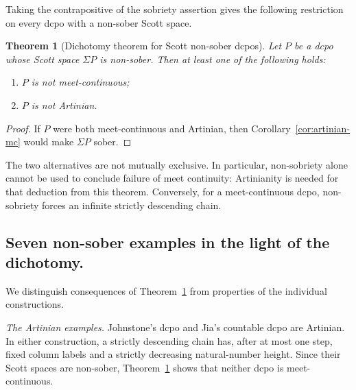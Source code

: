 \documentclass[11pt,reqno]{amsart}
\newtheorem{theorem}{Theorem}[section]
\theoremstyle{definition}
\numberwithin{equation}{section}
\begin{document}
Taking the contrapositive of the sobriety assertion gives the following
restriction on every dcpo with a non-sober Scott space.

\begin{theorem}[Dichotomy theorem for Scott non-sober dcpos]\label{thm:dichotomy}
Let $P$ be a dcpo whose Scott space $\Sigma P$ is non-sober.
Then at least one of the following holds:
\begin{enumerate}
\item[(1)] $P$ is not meet-continuous;
\item[(2)] $P$ is not Artinian.
\end{enumerate}
\end{theorem}

\begin{proof}
If $P$ were both meet-continuous and Artinian, then
Corollary~\ref{cor:artinian-mc} would make $\Sigma P$ sober.
\end{proof}

The two alternatives are not mutually exclusive. In particular,
non-sobriety alone cannot be used to conclude failure of meet continuity:
Artinianity is needed for that deduction from this theorem. Conversely,
for a meet-continuous dcpo, non-sobriety forces an infinite strictly
descending chain.

\subsection{Seven non-sober examples in the light of the dichotomy.}
We distinguish consequences of Theorem~\ref{thm:dichotomy} from
properties of the individual constructions.

\emph{The Artinian examples.}
Johnstone's dcpo \citep{Johnstone1981} and Jia's countable dcpo
\citep[Example~2.6.1]{Jia2018} are Artinian. In either construction, a
strictly descending chain has, after at most one step, fixed column
labels and a strictly decreasing natural-number height. Since their
Scott spaces are non-sober, Theorem~\ref{thm:dichotomy} shows that
neither dcpo is meet-continuous.
\end{document}
